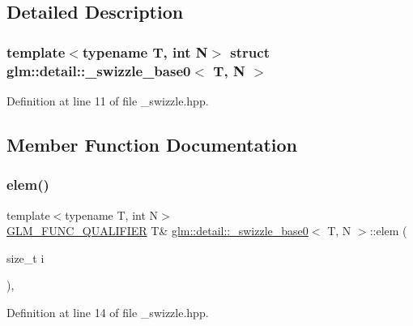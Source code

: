 \subsection{Detailed Description}
\subsubsection*{template$<$typename T, int N$>$\newline
struct glm\+::detail\+::\+\_\+swizzle\+\_\+base0$<$ T, N $>$}



Definition at line 11 of file \+\_\+swizzle.\+hpp.



\subsection{Member Function Documentation}
\mbox{\label{structglm_1_1detail_1_1__swizzle__base0_a4011ff1a445ccda72c385462106eb3ff}} 
\subsubsection{\texorpdfstring{elem()}{elem()}\hspace{0.1cm}{\footnotesize\ttfamily [1/2]}}
{\footnotesize\ttfamily template$<$typename T, int N$>$ \\
\mbox{\hyperlink{setup_8hpp_a33fdea6f91c5f834105f7415e2a64407}{G\+L\+M\+\_\+\+F\+U\+N\+C\+\_\+\+Q\+U\+A\+L\+I\+F\+I\+ER}} T\& \mbox{\hyperlink{structglm_1_1detail_1_1__swizzle__base0}{glm\+::detail\+::\+\_\+swizzle\+\_\+base0}}$<$ T, N $>$\+::elem (\begin{DoxyParamCaption}\item[{size\+\_\+t}]{i }\end{DoxyParamCaption})\hspace{0.3cm}{\ttfamily [inline]}, {\ttfamily [protected]}}



Definition at line 14 of file \+\_\+swizzle.\+hpp.

\mbox{\label{structglm_1_1detail_1_1__swizzle__base0_a495081f60b8fc565a5a35bfdd8b13c84}} 
